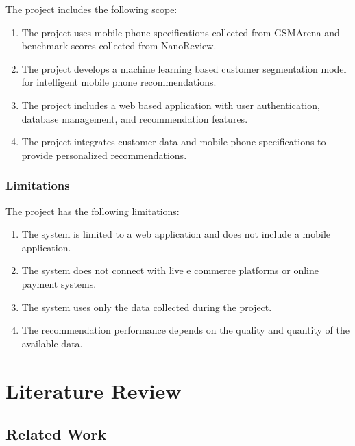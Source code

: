 \documentclass[12pt, a4paper]{report}
\numberwithin{equation}{chapter}
\begin{document}
The project includes the following scope:

\begin{enumerate}[label=\Roman*.]
    \item The project uses mobile phone specifications collected from GSMArena and benchmark scores collected from NanoReview.
    
    \item The project develops a machine learning based customer segmentation model for intelligent mobile phone recommendations.
    
    \item The project includes a web based application with user authentication, database management, and recommendation features.
    
    \item The project integrates customer data and mobile phone specifications to provide personalized recommendations.
\end{enumerate}

\subsection{Limitations}

The project has the following limitations:

\begin{enumerate}[label=\Roman*.]
    \item The system is limited to a web application and does not include a mobile application.
    
    \item The system does not connect with live e commerce platforms or online payment systems.
    
    \item The system uses only the data collected during the project.
    
    \item The recommendation performance depends on the quality and quantity of the available data.
\end{enumerate}
\chapter{Literature Review}

\section{Related Work}
\end{document}

